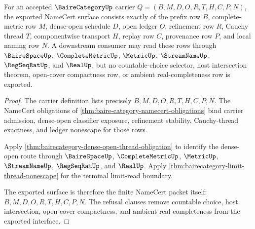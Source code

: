 \begin{theorem}
\label{thm:bairecategory-namecert-export-surface}
For an accepted $\BaireCategoryUp$ carrier $Q=(B,M,D,O,R,T,H,C,P,N)$, the exported NameCert surface consists exactly of the prefix row $B$, complete-metric row $M$, dense-open schedule $D$, open ledger $O$, refinement row $R$, Cauchy thread $T$, componentwise transport $H$, replay row $C$, provenance row $P$, and local naming row $N$. A downstream consumer may read these rows through $\BaireSpaceUp$, $\CompleteMetricUp$, $\MetricUp$, $\StreamNameUp$, $\RegSeqRatUp$, and $\RealUp$, but no countable-choice selector, host intersection theorem, open-cover compactness row, or ambient real-completeness row is exported.
\end{theorem}
\begin{proof}
The carrier definition lists precisely $B,M,D,O,R,T,H,C,P,N$. The NameCert obligations of \autoref{thm:baire-category-namecert-obligations} bind carrier admission, dense-open classifier exposure, refinement stability, Cauchy-thread exactness, and ledger nonescape for those rows.

Apply \autoref{thm:bairecategory-dense-open-thread-obligation} to identify the dense-open route through $\BaireSpaceUp$, $\CompleteMetricUp$, $\MetricUp$, $\StreamNameUp$, $\RegSeqRatUp$, and $\RealUp$. Apply \autoref{thm:bairecategory-limit-thread-nonescape} for the terminal limit-read boundary.

The exported surface is therefore the finite NameCert packet itself: $B,M,D,O,R,T,H,C,P,N$. The refusal clauses remove countable choice, host intersection, open-cover compactness, and ambient real completeness from the exported interface.
\end{proof}

